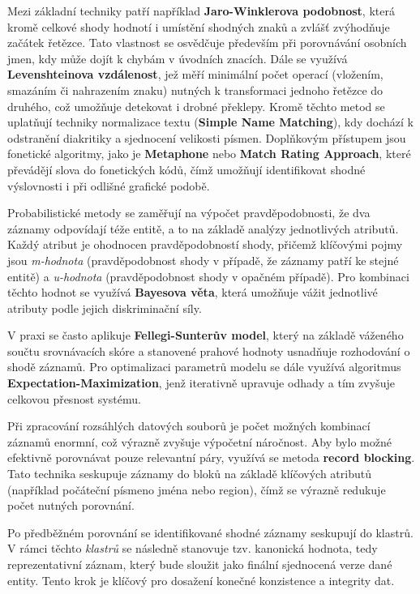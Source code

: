 Mezi základní techniky patří například \textbf{Jaro-Winklerova podobnost}, která kromě celkové shody hodnotí i umístění shodných znaků a zvlášť zvýhodňuje začátek řetězce. Tato vlastnost se osvědčuje především při porovnávání osobních jmen, kdy může dojít k chybám v úvodních znacích. Dále se využívá \textbf{Levenshteinova vzdálenost}, jež měří minimální počet operací (vložením, smazáním či nahrazením znaku) nutných k transformaci jednoho řetězce do druhého, což umožňuje detekovat i drobné překlepy. Kromě těchto metod se uplatňují techniky normalizace textu (\textbf{Simple Name Matching}), kdy dochází k odstranění diakritiky a sjednocení velikosti písmen. Doplňkovým přístupem jsou fonetické algoritmy, jako je \textbf{Metaphone} nebo \textbf{Match Rating Approach}, které převádějí slova do fonetických kódů, čímž umožňují identifikovat shodné výslovnosti i při odlišné grafické podobě.

Probabilistické metody se zaměřují na výpočet pravděpodobnosti, že dva záznamy odpovídají téže entitě, a to na základě analýzy jednotlivých atributů. Každý atribut je ohodnocen pravděpodobností shody, přičemž klíčovými pojmy jsou \textit{m-hodnota} (pravděpodobnost shody v případě, že záznamy patří ke stejné entitě) a \textit{u-hodnota} (pravděpodobnost shody v opačném případě). Pro kombinaci těchto hodnot se využívá \textbf{Bayesova věta}, která umožňuje vážit jednotlivé atributy podle jejich diskriminační síly.

V praxi se často aplikuje \textbf{Fellegi-Sunterův model}, který na základě váženého součtu srovnávacích skóre a stanovené prahové hodnoty usnadňuje rozhodování o shodě záznamů. Pro optimalizaci parametrů modelu se dále využívá algoritmus
\textbf{Expectation-Maximization}, jenž iterativně upravuje odhady a tím zvyšuje celkovou přesnost systému.

Při zpracování rozsáhlých datových souborů je počet možných kombinací záznamů enormní, což výrazně zvyšuje výpočetní náročnost. Aby bylo možné efektivně porovnávat pouze relevantní páry, využívá se metoda \textbf{record blocking}. Tato technika seskupuje záznamy do bloků na základě klíčových atributů (například počáteční písmeno jména nebo region), čímž se výrazně redukuje počet nutných porovnání.

Po předběžném porovnání se identifikované shodné záznamy seskupují do klastrů. V rámci těchto \textit{klastrů} se následně stanovuje tzv. kanonická hodnota, tedy reprezentativní záznam, který bude sloužit jako finální sjednocená verze dané entity. Tento krok je klíčový pro dosažení konečné konzistence a integrity dat.

